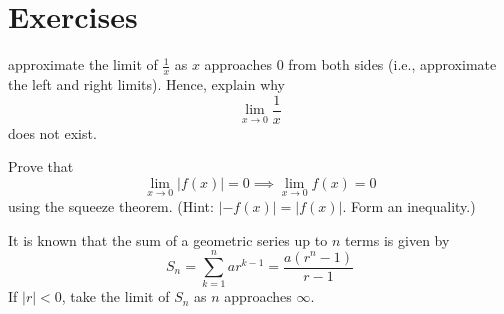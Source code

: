 \newpage
\section{Exercises}

\begin{exercise}
    approximate the limit of $\frac{1}{x}$ as $x$ approaches $0$ from both sides
    (i.e., approximate the left and right limits). Hence, explain why
    \[\lim_{x \to 0} \frac{1}{x}\]
    does not exist.
\end{exercise}

\begin{exercise}
    Prove that \[\lim_{x \to 0} |f(x)| = 0 \implies \lim_{x \to 0} f(x) = 0\]
    using the squeeze theorem. (Hint: $|-f(x)| = |f(x)|$. Form an inequality.)
\end{exercise}

\begin{exercise}
    It is known that the sum of a geometric series up to $n$ terms is given by
    \[S_n = \sum_{k=1}^n ar^{k - 1} = \frac{a(r^n - 1)}{r - 1}\]
    If $|r| < 0$, take the limit of $S_n$ as $n$ approaches $\infty$.
\end{exercise}